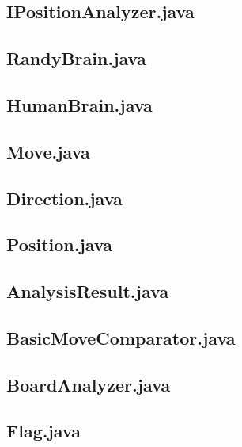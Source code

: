\documentclass [12pt ,a4paper, english]{scrartcl}
\theoremstyle{plain}
\theoremstyle{definition}
\theoremstyle{remark}
\begin{document}
\subsection{IPositionAnalyzer.java}


\subsection{RandyBrain.java}
\label{sec:randybrain}


\subsection{HumanBrain.java}
\label{sec:humanbrain}


\subsection{Move.java}


\subsection{Direction.java}


\subsection{Position.java}


\subsection{AnalysisResult.java}


\subsection{BasicMoveComparator.java}


\subsection{BoardAnalyzer.java}


\subsection{Flag.java}

\end{document}
